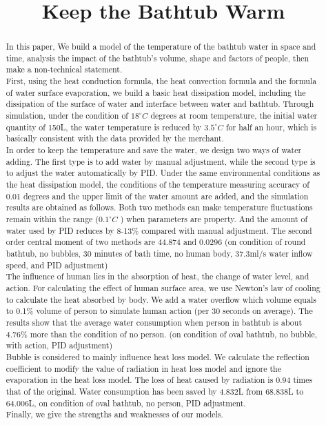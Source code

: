\documentclass{mcmthesis}
\title{}
\date{}
\begin{document}
\begin{abstract}%


\title{Keep the Bathtub Warm}
\indent In this paper,  We build a model of the temperature of the bathtub water in space and time, analysis the impact of the bathtub's volume, shape and factors of people, then make a non-technical statement.\\
\indent
First, using the heat conduction formula, the heat convection formula and the formula of water surface evaporation, we build a basic heat dissipation model, including the dissipation of the surface of water and interface between water and bathtub. Through simulation, under the condition of $18^{\circ}C$ degrees at room temperature, the initial water quantity of 150L,  the water temperature is reduced by $3.5^{\circ}C$ for half an hour, which is basically consistent with the data provided by the merchant.\\ 
\indent In order to keep the temperature and save the water, we design two ways of water adding. The first type is to add water by manual adjustment, while the second type is to adjust the water automatically by PID. Under the same environmental conditions as the heat dissipation model, the conditions of the temperature measuring accuracy of 0.01 degrees and the upper limit of the water amount are added, and the simulation results are obtained as follows. Both two methods can make temperature fluctuations remain within the range ($0.1^{\circ}C$ ) when parameters are property. And the amount of water used by PID reduces by 8-13\% compared with manual adjustment. The second order central moment of two methods are 44.874 and 0.0296 (on condition of round bathtub, no bubbles, 30 minutes of bath time, no human body, 37.3ml/s water inflow speed, and PID adjustment)\\
\indent The influence of human lies in the absorption of heat, the change of water level, and action. For calculating the effect of human surface area, we use Newton's law of cooling to calculate the heat absorbed by body.  We add a water overflow which volume equals to 0.1\% volume of person to simulate human action (per 30 seconds on average). The results show that the average water consumption when person in bathtub is about 4.76\% more than the condition of no person. (on condition of oval bathtub, no bubble, with action, PID adjustment)\\
\indent
Bubble is considered to  mainly influence heat loss model. We calculate the reflection coefficient to modify the value of radiation in heat loss model and ignore the evaporation in the heat loss model. The loss of heat caused by radiation is 0.94 times that of the original. Water consumption has been saved by 4.832L from 68.838L to 64.006L, on condition of oval bathtub, no person, PID adjustment.\\
\indent Finally, we give the strengths and weaknesses of our models. \\


\end{abstract}
\end{document}
